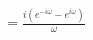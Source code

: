 \documentclass[preview]{standalone}
\begin{document}
\begin{align*}
&=\frac{i(e^{-i\omega}-e^{i\omega})}{\omega}
\end{align*}
\end{document}
